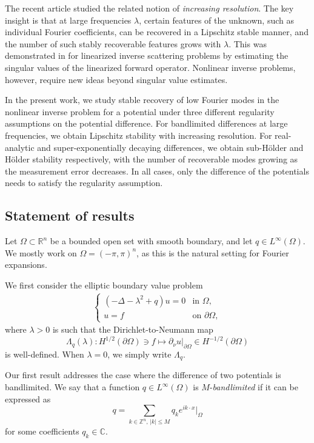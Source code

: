 \documentclass[a4paper, 11pt, twoside, notitlepage]{amsart}
\theoremstyle{definition}
\theoremstyle{remark}
\begin{document}
The recent article \cite{kow_increasing_2025} studied the related notion of \emph{increasing resolution}. The key insight is that at large frequencies $\lambda$, certain features of the unknown, such as individual Fourier coefficients, can be recovered in a Lipschitz stable manner, and the number of such stably recoverable features grows with $\lambda$. This was demonstrated in \cite{kow_increasing_2025} for linearized inverse scattering problems by estimating the singular values of the linearized forward operator. Nonlinear inverse problems, however, require new ideas beyond singular value estimates.


In the present work, we study stable recovery of low Fourier modes in the nonlinear inverse problem for a potential under three different regularity assumptions on the potential difference. For bandlimited differences at large frequencies, we obtain Lipschitz stability with increasing resolution. For real-analytic and super-exponentially decaying differences, we obtain sub-Hölder and Hölder stability respectively, with the number of recoverable modes growing as the measurement error decreases. In all cases, only the difference of the potentials needs to satisfy the regularity assumption.

\subsection{Statement of results}

Let $\Omega \subset \mathbb{R}^n$ be a bounded open set with smooth boundary, and let $q \in L^{\infty}(\Omega)$. We mostly work on  $\Omega = (-\pi,\pi)^n$, as this is the natural setting for Fourier expansions. 

We first consider the elliptic boundary value problem
\begin{align}
    \begin{cases}
        (-\Delta-\lambda^2+q)u=0 & \text{in } \Omega, \\ 
        u = f & \text{on } \partial \Omega,
    \end{cases}\label{eq:bvp}
\end{align}
where $\lambda > 0$ is such that the Dirichlet-to-Neumann map 
\[
\Lambda_q(\lambda): H^{1/2}(\partial \Omega) \ni f \mapsto \partial_\nu u|_{\partial \Omega} \in H^{-1/2}(\partial \Omega)
\]
is well-defined. When $\lambda = 0$, we simply write $\Lambda_q$.

Our first result addresses the case where the difference of two potentials is bandlimited. We say that a function $q \in L^{\infty}(\Omega)$ is $M$-\emph{bandlimited} if it can be expressed as
\[
q = \sum_{k \in \mathbb{Z}^n, \, |k| \leq M} q_k e^{ik \cdot x} \Big|_{\Omega}
\]
for some coefficients $q_k \in \mathbb{C}$.
\end{document}
